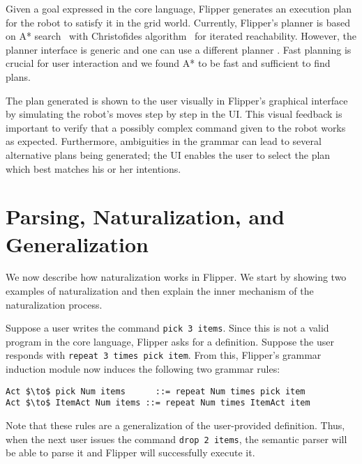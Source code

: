 \documentclass[letterpaper, 10 pt, conference]{ieeeconf}  %
\newcommand{\tool}{Flipper\xspace}
\begin{document}

Given a goal expressed in the core language,
\tool generates an execution plan for the robot to satisfy it in the grid world.
Currently, \tool's planner is based on A* search~\cite{Astar} with Christofides algorithm~\cite{christofides}
for iterated reachability.
However, the planner interface is generic and one can use
a different planner \cite{golog,pddl,hadasLTLMop,ankushDrona,antlab}.
Fast planning is crucial for user interaction and we found
A* to be fast and sufficient to find plans.

The plan generated is shown to the user visually in \tool's graphical interface
by simulating the robot's moves step by step in the UI.
This visual feedback is important to verify that a possibly complex command given to
the robot works as expected.
Furthermore, ambiguities in the grammar can lead to several alternative plans
being generated; the UI enables the user to select the plan which best matches
his or her intentions.





\section{Parsing, Naturalization, and Generalization}
\label{sec:naturalization}


We now describe how naturalization works in \tool.
We start by showing two examples of naturalization and then
explain the inner mechanism of the naturalization process.

\begin{example}\label{ex:pick-3-items}
Suppose a user writes the command \lstinline{pick 3 items}. Since this is not a valid program
in the core language, \tool asks for a definition.
Suppose the user responds with \lstinline{repeat 3 times pick item}.
From this, \tool's grammar induction module now induces the following
two grammar rules:
\begin{lstlisting}
Act $\to$ pick Num items      ::= repeat Num times pick item
Act $\to$ ItemAct Num items ::= repeat Num times ItemAct item
\end{lstlisting}
%
Note that these rules are a generalization of the user-provided definition.
Thus, when the next user issues the command \lstinline{drop 2 items}, the semantic parser
will be able to parse it and \tool will successfully execute it.
\end{example}
\end{document}
